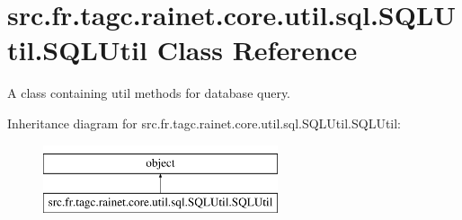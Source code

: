 \hypertarget{classsrc_1_1fr_1_1tagc_1_1rainet_1_1core_1_1util_1_1sql_1_1SQLUtil_1_1SQLUtil}{\section{src.\-fr.\-tagc.\-rainet.\-core.\-util.\-sql.\-S\-Q\-L\-Util.\-S\-Q\-L\-Util Class Reference}
\label{classsrc_1_1fr_1_1tagc_1_1rainet_1_1core_1_1util_1_1sql_1_1SQLUtil_1_1SQLUtil}
}


A class containing util methods for database query.  


Inheritance diagram for src.\-fr.\-tagc.\-rainet.\-core.\-util.\-sql.\-S\-Q\-L\-Util.\-S\-Q\-L\-Util\-:\begin{figure}[H]
\begin{center}
\leavevmode
\includegraphics[height=2.000000cm]{classsrc_1_1fr_1_1tagc_1_1rainet_1_1core_1_1util_1_1sql_1_1SQLUtil_1_1SQLUtil}
\end{center}
\end{figure}
